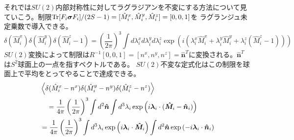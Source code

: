 \documentclass[11pt, aps, longbibliography]{article}
\begin{document}
        それでは$SU(2)$内部対称性に対してラグラジアンを不変にする方法について見ていこう。制限$\Tr[F_i \boldsymbol{\sigma} F_i]/(2S-1) = [\hat{M}_i^x, \hat{M}_i^y, \hat{M}_i^z] = [0,0,1]$を
        ラグランジュ未定乗数で導入できる。
        \begin{equation}\label{eq:highS-MF-19}
            \delta(\hat{M}_i^x)\delta(\hat{M}_i^y)\delta(\hat{M}_i^z-1) = \left(\frac{1}{2\pi}\right)^3 \int d\lambda_i^xd\lambda_i^yd\lambda_i^z \exp\left( i(\lambda_i^x\hat{M}_i^x + \lambda_i^y\hat{M}_i^y + \lambda_i^z(\hat{M}_i^z-1)) \right)
        \end{equation}
        $SU(2)$変換によって制限は$R^{-1}[0,0,1] = [n^x,n^y,n^z] = \hat{\boldsymbol{n}}^T$に変換される。$\hat{\boldsymbol{n}}^T$は$S^2$球面上の一点を指すベクトルである。
        $SU(2)$不変な定式化はこの制限を球面上で平均をとってやることで達成できる。
        \begin{align}\label{eq:highS-MF-20}
            &\expval{\delta(\hat{M}_i^x - n^x)\delta(\hat{M}_i^y - n^y)\delta(\hat{M}_i^z - n^z)} \notag \\
            & \quad = \frac{1}{4\pi} \left(\frac{1}{2\pi}\right)^3 \int d^2\boldsymbol{\hat{n}} \int d^3 \lambda_i \exp\left( i\boldsymbol{\lambda}_i \cdot (\boldsymbol{\hat{M}}_i-\boldsymbol{\hat{n}}_i) \right) \notag \\
            &=  \frac{1}{4\pi} \left(\frac{1}{2\pi}\right)^3 \int d^3 \lambda_i \exp\left( i\boldsymbol{\lambda}_i \cdot \boldsymbol{\hat{M}}_i \right)  \int d^2\boldsymbol{\hat{n}}  \exp \left( -i\boldsymbol{\lambda}_i \cdot \boldsymbol{\hat{n}}_i \right)
        \end{align}
\end{document}
